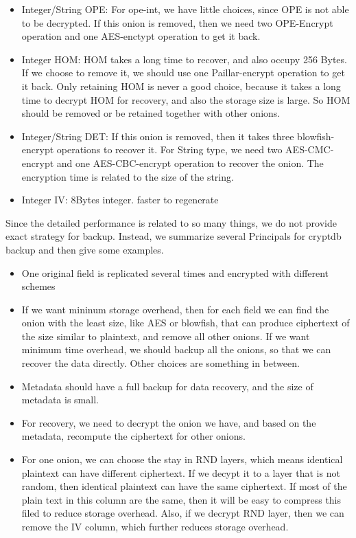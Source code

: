 \begin{itemize}
\item Integer/String OPE: For ope-int, we have little choices, since OPE is not able to be decrypted. If this onion is removed, then we need two OPE-Encrypt operation and one AES-enctypt operation to get it back. 
\item Integer HOM: HOM takes a long time to recover, and also occupy 256 Bytes. If we choose to remove it, we should use one Paillar-encrypt operation to get it back. Only retaining HOM is never a good choice, because it takes a long time to decrypt HOM for recovery, and also the storage size is large. So HOM should be removed or be retained together with other onions.
\item Integer/String DET: If this onion is removed, then it takes three blowfish-encrypt operations to recover it. For String type, we need two AES-CMC-encrypt and one AES-CBC-encrypt operation to recover the onion. The encryption time is related to the size of the string.
\item Integer IV: 8Bytes integer. faster to regenerate
\end{itemize}



Since the detailed performance is related to so many things, we do not provide exact strategy for backup. Instead, we summarize several Principals for cryptdb backup and then give some examples. 

\begin{itemize}
\item One original field is replicated several times and encrypted with different schemes
\item If we want mininum storage overhead, then for each field we can find the onion with the least size, like AES or blowfish, that can produce ciphertext of the size similar to plaintext, and remove all other onions. If we want minimum time overhead, we should backup all the onions, so that we can recover the data directly. Other choices are something in between.
\item Metadata should have a full backup for data recovery, and the size of metadata is small. 
\item For recovery, we need to decrypt the onion we have, and based on the metadata, recompute the ciphertext for other onions.
\item For one onion, we can choose the stay in RND layers, which means identical plaintext can have different ciphertext. If we decypt it to a layer that is not random, then identical plaintext can have the same ciphertext. If most of the plain text in this column are the same, then it will be easy to compress this filed to reduce storage overhead. Also, if we decrypt RND layer, then we can remove the IV column, which further reduces storage overhead.
\end{itemize}


